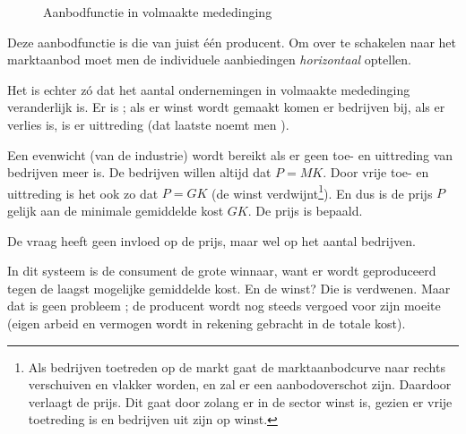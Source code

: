\begin{figure}[H]
\vspace{0.5cm}
\centering
\captionsetup{justification=centering,margin=2cm}
\caption{Aanbodfunctie in volmaakte mededinging}
\label{fig:h3aanbod3}
\end{figure}

Deze aanbodfunctie is die van juist \'e\'en producent. Om over te schakelen naar het marktaanbod moet men de individuele aanbiedingen \textit{horizontaal} optellen. 
\par Het is echter z\'o dat het aantal ondernemingen in volmaakte mededinging veranderlijk is. Er is  ; als er winst wordt gemaakt komen er bedrijven bij, als er verlies is, is er uittreding (dat laatste noemt men ).
\par Een evenwicht (van de industrie) wordt bereikt als er geen toe- en uittreding van bedrijven meer is. De bedrijven willen altijd dat $P=MK$. Door vrije toe- en uittreding is het ook zo dat $P=GK$ (de winst verdwijnt\footnote{Als bedrijven toetreden op de markt gaat de marktaanbodcurve naar rechts verschuiven en vlakker worden, en zal er een aanbodoverschot zijn. Daardoor verlaagt de prijs. Dit gaat door zolang er in de sector winst is, gezien er vrije toetreding is en bedrijven uit zijn op winst.}). En dus is de prijs $P$ gelijk aan de minimale gemiddelde kost $GK$. De prijs is  bepaald.
\par De vraag heeft geen invloed op de prijs, maar wel op het aantal bedrijven.\\

\par In dit systeem is de consument de grote winnaar, want er wordt geproduceerd tegen de laagst mogelijke gemiddelde kost. En de winst? Die is verdwenen. Maar dat is geen probleem ; de producent wordt nog steeds vergoed voor zijn moeite (eigen arbeid en vermogen wordt in rekening gebracht in de totale kost).

